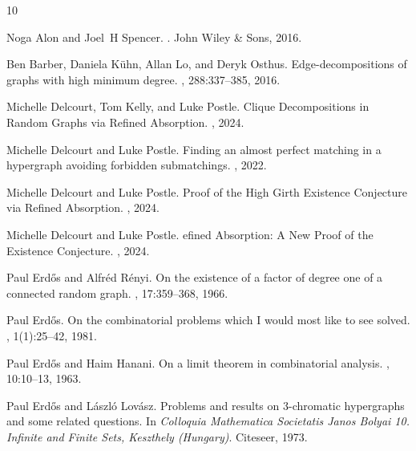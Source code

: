 \documentclass[11pt]{article}
\numberwithin{equation}{section}
\newcounter{i}
\theoremstyle{plain}
\theoremstyle{plain} %
\theoremstyle{definition}
\begin{document}



\begin{thebibliography}{10}

Noga Alon and Joel~H Spencer.
.
\newblock John Wiley \& Sons, 2016.

Ben Barber, Daniela K\"{u}hn, Allan Lo, and Deryk Osthus.
\newblock Edge-decompositions of graphs with high minimum degree.
, 288:337--385, 2016.

Michelle Delcourt, Tom Kelly, and Luke Postle.
\newblock Clique {D}ecompositions in {R}andom {G}raphs via {R}efined
  {A}bsorption.
, 2024.

Michelle Delcourt and Luke Postle.
\newblock Finding an almost perfect matching in a hypergraph avoiding forbidden
  submatchings.
, 2022.

Michelle Delcourt and Luke Postle.
\newblock Proof of the {H}igh {G}irth {E}xistence {C}onjecture via {R}efined
  {A}bsorption.
, 2024.

Michelle Delcourt and Luke Postle.
efined {A}bsorption: {A} {N}ew {P}roof of the {E}xistence
  {C}onjecture.
, 2024.

Paul Erd\H{o}s and Alfr\'{e}d R\'{e}nyi.
\newblock On the existence of a factor of degree one of a connected random
  graph.
, 17:359--368, 1966.

Paul Erd{\H{o}}s.
\newblock On the combinatorial problems which {I} would most like to see
  solved.
, 1(1):25--42, 1981.

Paul Erd{\H{o}}s and Haim Hanani.
\newblock On a limit theorem in combinatorial analysis.
, 10:10--13, 1963.

Paul Erd{\H{o}}s and L{\'a}szl{\'o} Lov{\'a}sz.
\newblock Problems and results on 3-chromatic hypergraphs and some related
  questions.
\newblock In {\em Colloquia Mathematica Societatis Janos Bolyai 10. Infinite
  and Finite Sets, Keszthely (Hungary)}. Citeseer, 1973.


\end{thebibliography}
\end{document}
